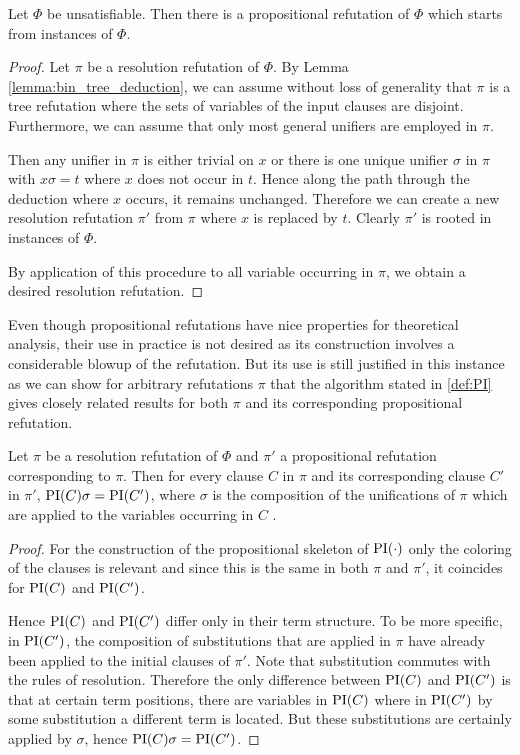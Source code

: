 \begin{lemma}
	Let $\Phi$ be unsatisfiable.
	Then there is a propositional refutation of $\Phi$ which starts from instances of $\Phi$.
\end{lemma}
\begin{proof}
	Let $\pi$ be a resolution refutation of $\Phi$.
	By Lemma \ref{lemma:bin_tree_deduction}, we can assume without loss of generality that $\pi$ is a tree refutation where the sets of variables of the input clauses are disjoint.
	Furthermore, we can assume that only most general unifiers are employed in $\pi$.

	Then any unifier in $\pi$ is either trivial on $x$ or there is one unique unifier $\sigma$ in $\pi$ with $x\sigma = t$ where $x$ does not occur in $t$.
	Hence along the path through the deduction where $x$ occurs, it remains unchanged.
	Therefore we can create a new resolution refutation $\pi'$ from $\pi$ where $x$ is replaced by $t$.
	Clearly $\pi'$ is rooted in instances of $\Phi$.

	By application of this procedure to all variable occurring in $\pi$, we obtain a desired resolution refutation.
\end{proof}

Even though propositional refutations have nice properties for theoretical analysis, their use in practice is not desired as its construction involves a considerable blowup of the refutation. 
But its use is still justified in this instance as we can show for arbitrary refutations $\pi$
that the algorithm stated in \ref{def:PI} gives closely related results for both $\pi$ and its corresponding propositional refutation.

\begin{lemma}
	Let $\pi$ be a resolution refutation of $\Phi$ and $\pi'$ a propositional refutation corresponding to $\pi$.
	Then for every clause $C$ in $\pi$ and its corresponding clause $C'$ in $\pi'$, $\operatorname{PI}(C)\sigma = \operatorname{PI}(C')$, where $\sigma$ is the composition of the unifications of $\pi$ which are applied to the variables occurring in $C$ .
\end{lemma}
\begin{proof}
	For the construction of the propositional skeleton of $\operatorname{PI}(\cdot)$ only the coloring of the clauses is relevant and since this is the same in both $\pi$ and $\pi'$, it coincides for $\operatorname{PI}(C)$ and $\operatorname{PI}(C')$.

	Hence $\operatorname{PI}(C)$ and $\operatorname{PI}(C')$ differ only in their term structure. 
	To be more specific, in $\operatorname{PI}(C')$, the composition of substitutions that are applied in $\pi$ have already been applied to the initial clauses of $\pi'$. 
	Note that substitution commutes with the rules of resolution.
	Therefore the only difference between $\operatorname{PI}(C)$ and $\operatorname{PI}(C')$ is that at certain term positions, there are variables in $\operatorname{PI}(C)$ where in $\operatorname{PI}(C')$ by some substitution a different term is located. 
	But these substitutions are certainly applied by $\sigma$, hence $\operatorname{PI}(C)\sigma = \operatorname{PI}(C')$.
\end{proof}

